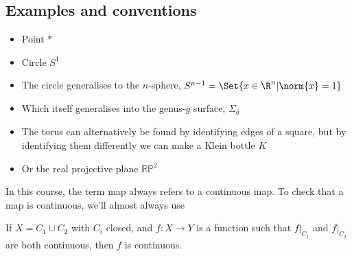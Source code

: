 \documentclass{article}
\numberwithin{nthm}{subsection}
\begin{document}
\subsection{Examples and conventions}

\begin{eg}
    \leavevmode
    \begin{itemize}
        \item Point $*$
        \item Circle $S^1$
        \item The circle generalises to the $n$-sphere, $S^{n-1} = \Set{x \in \R^n | \norm{x} = 1}$
        \item Which itself generalises into the genus-$g$ surface, $\Sigma_g$
        \item The torus can alternatively be found by identifying edges of a square, but by identifying them differently we can make a Klein bottle $K$
        \item Or the real projective plane $\mathbb{RP}^2$
    \end{itemize}



\end{eg}

In this course, the term map always refers to a continuous map.
To check that a map is continuous, we'll almost always use

\begin{lemma}
    If $X = C_1 \cup C_2$ with $C_i$ closed, and $f: X \to Y$ is a function such that $f|_{C_1}$ and $f|_{C_2}$ are both continuous, then $f$ is continuous.
\end{lemma}
\end{document}
